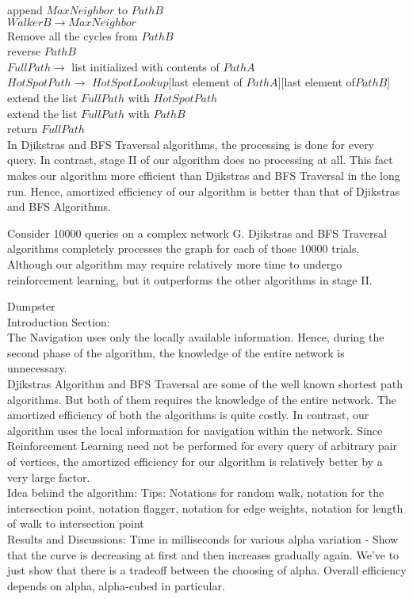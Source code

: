 \documentclass{article}
\begin{document}
		append $MaxNeighbor$ to $PathB$\\
		$WalkerB \to MaxNeighbor$\\
	Remove all the cycles from $PathB$\\

	reverse $PathB$\\
	$FullPath \to $ list initialized with contents of $PathA$\\
	$HotSpotPath\to$ $HotSpotLookup[$last element of $PathA][$last element of$ PathB]$\\
	extend the list $FullPath$ with $HotSpotPath$\\
	extend the list $FullPath$ with $PathB$\\
	return $FullPath$\\
	
In Djikstras and BFS Traversal algorithms, the processing is done for every query. In contrast, stage II of our algorithm does no processing at all. This fact makes our algorithm more efficient than Djikstras and BFS Traversal in the long run. Hence, amortized efficiency of our algorithm is better than that of Djikstras and BFS Algorithms.

Consider 10000 queries on a complex network G. Djikstras and BFS Traversal algorithms completely processes the graph for each of those 10000 trials. Although our algorithm may require relatively more time to undergo reinforcement learning, but it outperforms the other algorithms in stage II.

Dumpster\\

Introduction Section:\\
The Navigation uses only the locally available information. Hence, during the second phase of the algorithm, the knowledge of the entire network is unnecessary.\\

Djikstras Algorithm and BFS Traversal are some of the well known shortest path algorithms. But both of them requires the knowledge of the entire network. The amortized efficiency of both the algorithms is quite costly. In contrast, our algorithm uses the local information for navigation within the network. Since Reinforcement Learning need not be performed for every query of arbitrary pair of vertices, the amortized efficiency for our algorithm is relatively better by a very large factor.\\

Idea behind the algorithm:
Tips: Notations for random walk, notation for the intersection point, notation flagger, notation for edge weights, notation for length of walk to intersection point\\

Results and Discussions:
Time in milliseconds for various alpha variation - Show that the curve is decreasing at first and then increases gradually again.
We've to just show that there is a tradeoff between the choosing of alpha.
Overall efficiency depends on alpha, alpha-cubed in particular.
\end{document}
